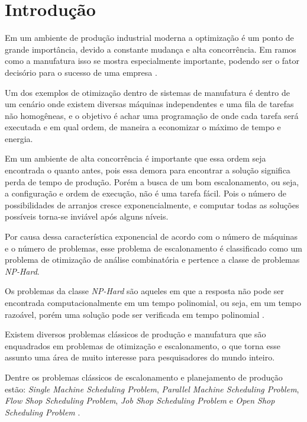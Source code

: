 \chapter{Introdução}
Em um ambiente de produção industrial moderna a optimização é um ponto de grande importância, devido a constante mudança e alta concorrência. Em ramos como a manufatura isso se mostra especialmente importante, podendo ser o fator decisório para o sucesso de uma empresa \cite{Wari2016}.\newline

Um dos exemplos de otimização dentro de sistemas de manufatura é dentro de um cenário onde existem diversas máquinas independentes e uma fila de tarefas não homogêneas, e o objetivo é achar uma programação de onde cada tarefa será executada e em qual ordem, de maneira a economizar o máximo de tempo e energia.\newline

Em um ambiente de alta concorrência é importante que essa ordem seja encontrada o quanto antes, pois essa demora para encontrar a solução significa perda de tempo de produção. Porém a busca de um bom escalonamento, ou seja, a configuração e ordem de execução, não é uma tarefa fácil. Pois o número de possibilidades de arranjos cresce exponencialmente, e computar todas as soluções possíveis torna-se inviável após alguns níveis. \newline

Por causa dessa característica exponencial de acordo com o número de máquinas e o número de problemas, esse problema de escalonamento é classificado como um problema de otimização de análise combinatória e pertence a classe de problemas \textit{NP-Hard}. \newline

Os problemas da classe \textit{NP-Hard} são aqueles em que a resposta não pode ser encontrada computacionalmente em um tempo polinomial, ou seja, em um tempo razoável, porém uma solução pode ser verificada em tempo polinomial \cite{Eswaramurthy2008}.\newline

Existem diversos problemas clássicos de produção e manufatura que são enquadrados em problemas de otimização e escalonamento, o que torna esse assunto uma área de muito interesse para pesquisadores do mundo inteiro.\newline

Dentre os problemas clássicos de escalonamento e planejamento de produção estão: 
\textit{Single Machine Scheduling Problem}, 
\textit{Parallel Machine Scheduling Problem}, 
\textit{Flow Shop Scheduling Problem}, 
\textit{Job Shop Scheduling Problem} e 
\textit{Open Shop Scheduling Problem} 
\cite{Allahverdi2008}.\newline

